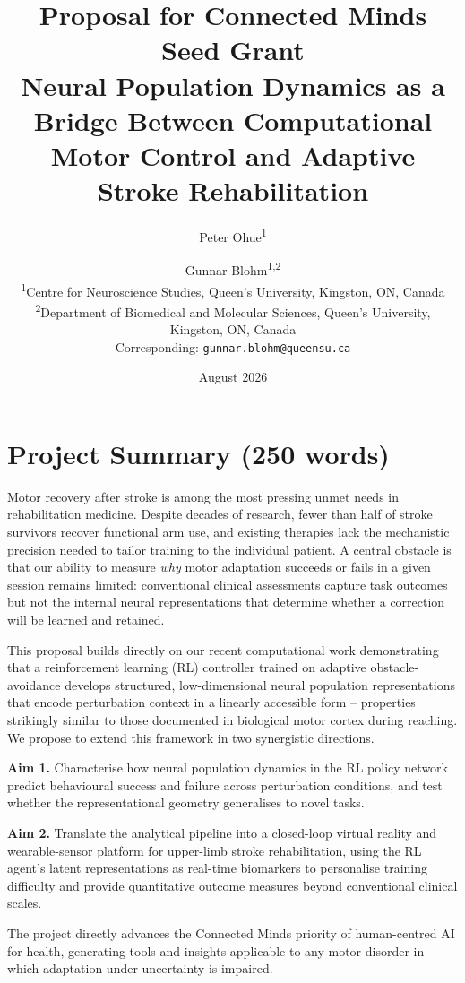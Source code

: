 \documentclass[12pt]{article}
\title{\textbf{Proposal for Connected Minds Seed Grant}\\[6pt]
\large\textbf{Neural Population Dynamics as a Bridge Between Computational
Motor Control and Adaptive Stroke Rehabilitation}}
\author{%
  Peter Ohue\textsuperscript{1} \and Gunnar Blohm\textsuperscript{1,2}\\[4pt]
  \small\textsuperscript{1}Centre for Neuroscience Studies, Queen's University,
  Kingston, ON, Canada\\
  \small\textsuperscript{2}Department of Biomedical and Molecular Sciences,
  Queen's University, Kingston, ON, Canada\\[4pt]
  \small Corresponding: \texttt{gunnar.blohm@queensu.ca}
}
\date{August 2026}
\begin{document}
\maketitle

\section{Project Summary (250 words)}

Motor recovery after stroke is among the most pressing unmet needs in
rehabilitation medicine.
Despite decades of research, fewer than half of stroke survivors recover
functional arm use, and existing therapies lack the mechanistic precision
needed to tailor training to the individual patient.
A central obstacle is that our ability to measure \emph{why} motor
adaptation succeeds or fails in a given session remains limited: conventional
clinical assessments capture task outcomes but not the internal neural
representations that determine whether a correction will be learned and
retained.

This proposal builds directly on our recent computational work demonstrating
that a reinforcement learning (RL) controller trained on adaptive
obstacle-avoidance develops structured, low-dimensional neural population
representations that encode perturbation context in a linearly accessible
form -- properties strikingly similar to those documented in biological
motor cortex during reaching.
We propose to extend this framework in two synergistic directions.

\textbf{Aim 1.} Characterise how neural population dynamics in the RL policy
network predict behavioural success and failure across perturbation
conditions, and test whether the representational geometry generalises to
novel tasks.

\textbf{Aim 2.} Translate the analytical pipeline into a closed-loop
virtual reality and wearable-sensor platform for upper-limb stroke
rehabilitation, using the RL agent's latent representations as real-time
biomarkers to personalise training difficulty and provide quantitative
outcome measures beyond conventional clinical scales.

The project directly advances the Connected Minds priority of
human-centred AI for health, generating tools and insights applicable to
any motor disorder in which adaptation under uncertainty is impaired.
\end{document}

